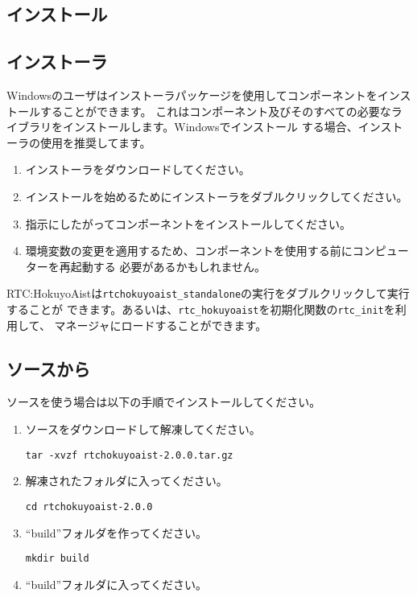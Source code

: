 \documentclass[a4paper,10pt]{article}
\newenvironment{Japanese}{%
  \CJKfamily{min}%
  \CJKtilde
  \CJKnospace}{}
\begin{document}
\begin{CJK}{UTF8}{}
\begin{Japanese}
\section{インストール}
\label{sec:installation}

\subsection{インストーラ}

Windowsのユーザはインストーラパッケージを使用してコンポーネントをインストールすることができます。
これはコンポーネント及びそのすべての必要なライブラリをインストールします。Windowsでインストール
する場合、インストーラの使用を推奨してます。

\begin{enumerate}
  \item インストーラをダウンロードしてください。
  \item インストールを始めるためにインストーラをダブルクリックしてください。
  \item 指示にしたがってコンポーネントをインストールしてください。
  \item 環境変数の変更を適用するため、コンポーネントを使用する前にコンピューターを再起動する
必要があるかもしれません。
\end{enumerate}

RTC:HokuyoAistは\verb|rtchokuyoaist_standalone|の実行をダブルクリックして実行することが
できます。あるいは、\verb|rtc_hokuyoaist|を初期化関数の\verb|rtc_init|を利用して、
マネージャにロードすることができます。

\subsection{ソースから}

ソースを使う場合は以下の手順でインストールしてください。

\begin{enumerate}
  \item ソースをダウンロードして解凍してください。

  \verb|tar -xvzf rtchokuyoaist-2.0.0.tar.gz|
  \item 解凍されたフォルダに入ってください。

  \verb|cd rtchokuyoaist-2.0.0|
  \item ``build''フォルダを作ってください。

  \verb|mkdir build|
  \item ``build''フォルダに入ってください。


\end{enumerate}
\end{Japanese}
\end{CJK}
\end{document}
